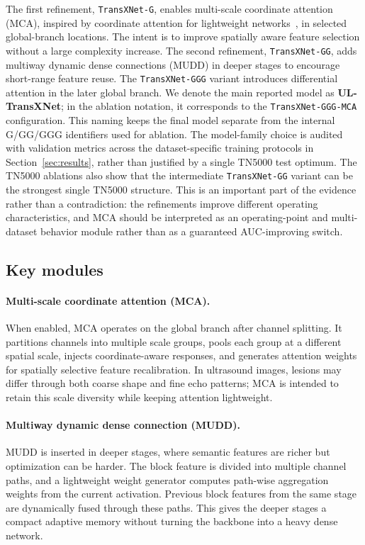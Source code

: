 The first refinement, \texttt{TransXNet-G}, enables multi-scale coordinate attention (MCA), inspired by coordinate attention for lightweight networks~\cite{hou2021coordinate}, in selected global-branch locations. The intent is to improve spatially aware feature selection without a large complexity increase. The second refinement, \texttt{TransXNet-GG}, adds multiway dynamic dense connections (MUDD) in deeper stages to encourage short-range feature reuse. The \texttt{TransXNet-GGG} variant introduces differential attention in the later global branch. We denote the main reported model as \textbf{UL-TransXNet}; in the ablation notation, it corresponds to the \texttt{TransXNet-GGG-MCA} configuration. This naming keeps the final model separate from the internal G/GG/GGG identifiers used for ablation. The model-family choice is audited with validation metrics across the dataset-specific training protocols in Section~\ref{sec:results}, rather than justified by a single TN5000 test optimum. The TN5000 ablations also show that the intermediate \texttt{TransXNet-GG} variant can be the strongest single TN5000 structure. This is an important part of the evidence rather than a contradiction: the refinements improve different operating characteristics, and MCA should be interpreted as an operating-point and multi-dataset behavior module rather than as a guaranteed AUC-improving switch.

\subsection{Key modules}
\paragraph{Multi-scale coordinate attention (MCA).}
When enabled, MCA operates on the global branch after channel splitting. It partitions channels into multiple scale groups, pools each group at a different spatial scale, injects coordinate-aware responses, and generates attention weights for spatially selective feature recalibration. In ultrasound images, lesions may differ through both coarse shape and fine echo patterns; MCA is intended to retain this scale diversity while keeping attention lightweight.

\paragraph{Multiway dynamic dense connection (MUDD).}
MUDD is inserted in deeper stages, where semantic features are richer but optimization can be harder. The block feature is divided into multiple channel paths, and a lightweight weight generator computes path-wise aggregation weights from the current activation. Previous block features from the same stage are dynamically fused through these paths. This gives the deeper stages a compact adaptive memory without turning the backbone into a heavy dense network.

